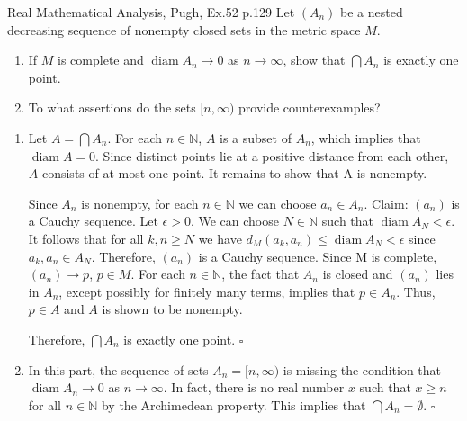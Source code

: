 \begin{problem}{}{}{Real Mathematical Analysis, Pugh, Ex.52 p.129}
Let \((A_n)\) be a nested decreasing sequence of nonempty closed sets
in the metric space \(M\).
\begin{enumerate}
    \item[(a)] If \(M\) is complete and \(\operatorname{diam} A_n \to 0 \) as \(n \to \infty\),
          show that $\bigcap A_n$ is exactly one point.
    \item[(b)] To what assertions do the sets $[n, \infty)$ provide counterexamples?
\end{enumerate}
\end{problem}

\begin{solution}
\begin{enumerate}
    \item[(a)] 
    Let \(A = \bigcap A_n\). For each \(n \in \mathbb{N}\), \(A\) is a subset of \(A_n\), 
    which implies that \(\operatorname{diam} A = 0\). Since distinct points lie 
    at a positive distance from each other, \(A\) consists of at most one point. 
    It remains to show that A is nonempty. 
    
    Since \(A_n\) is nonempty, for each \(n \in \mathbb{N} \) we can choose
    \(a_n \in A_n\). Claim: \((a_n)\) is a Cauchy sequence. Let \(\epsilon > 0\). 
    We can choose \(N \in \mathbb{N} \) such that \(\operatorname{diam} A_N < \epsilon\). 
    It follows that for all \(k, n \ge N \) we have \(d_M(a_k, a_n) \leq \operatorname{diam}A_N < \epsilon \) since \(a_k, a_n \in A_N\). 
    Therefore, \((a_n)\) is a Cauchy sequence. Since M is complete, \((a_n) \to p\), \(p \in M\). 
    For each \(n \in \mathbb{N}\), the fact that \(A_n\) is closed and \((a_n)\) lies in \(A_n\), except possibly for finitely many terms,
    implies that \(p \in A_n\). Thus, \(p \in A\) and \(A\) is shown to be nonempty.

    Therefore, \(\bigcap A_n \) is exactly one point.
    \hfill $\square$

    \item[(b)]
    In this part, the sequence of sets \(A_n = [n, \infty) \) is missing the condition that
    \(\operatorname{diam}A_n \to 0\) as \(n \to \infty\). 
    In fact, there is no real number \(x\) such that \(x \geq  n\) for all \(n \in \mathbb{N}\) by the Archimedean property. 
    This implies that \(\bigcap A_n = \emptyset \).
    \hfill $\square$
\end{enumerate}
\end{solution}